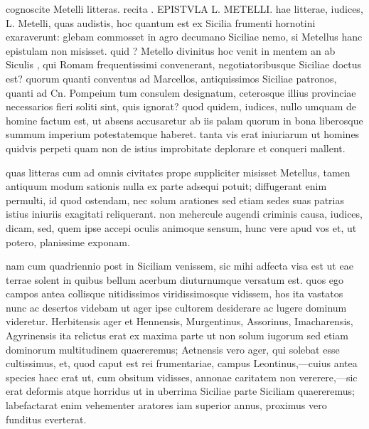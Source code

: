  cognoscite Metelli litteras. recita . EPISTVLA L. METELLI. hae litterae, iudices, L. Metelli, quas audistis, hoc quantum est ex Sicilia frumenti hornotini exaraverunt: glebam commosset in agro decumano Siciliae nemo, si Metellus hanc epistulam non misisset. quid ? Metello divinitus hoc venit in mentem an ab Siculis , qui Romam frequentissimi convenerant, negotiatoribusque Siciliae doctus est? quorum quanti conventus ad Marcellos, antiquissimos Siciliae patronos, quanti ad Cn. Pompeium tum consulem designatum, ceterosque illius provinciae necessarios fieri soliti sint, quis ignorat? quod quidem, iudices, nullo umquam de homine factum est, ut absens accusaretur ab iis palam quorum in bona liberosque summum imperium potestatemque haberet. tanta vis erat iniuriarum ut homines quidvis perpeti quam non de istius improbitate deplorare et conqueri mallent.

 quas litteras cum ad omnis civitates prope suppliciter misisset Metellus, tamen antiquum modum sationis nulla ex parte adsequi potuit; diffugerant enim permulti, id quod ostendam, nec solum arationes sed etiam sedes suas patrias istius iniuriis exagitati reliquerant. non mehercule augendi criminis causa, iudices, dicam, sed, quem ipse accepi oculis animoque sensum, hunc vere apud vos et, ut potero, planissime exponam.

 nam cum quadriennio post in Siciliam venissem, sic mihi adfecta visa est ut eae terrae solent in quibus bellum acerbum diuturnumque versatum est. quos ego campos antea collisque nitidissimos viridissimosque vidissem, hos ita vastatos nunc ac desertos videbam ut ager ipse cultorem desiderare ac lugere dominum videretur. Herbitensis ager et Hennensis, Murgentinus, Assorinus, Imacharensis, Agyrinensis ita relictus erat ex maxima parte ut non solum iugorum sed etiam dominorum multitudinem quaereremus; Aetnensis vero ager, qui solebat esse cultissimus, et, quod caput est rei frumentariae, campus Leontinus,—cuius antea species haec erat ut, cum obsitum vidisses, annonae caritatem non vererere,—sic erat deformis atque horridus ut in uberrima Siciliae parte Siciliam quaereremus; labefactarat enim vehementer aratores iam superior annus, proximus vero funditus everterat.

